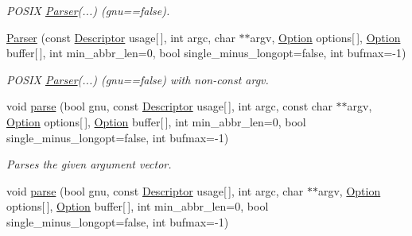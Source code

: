 \begin{DoxyCompactItemize}
\begin{DoxyCompactList}\small\item\em P\+O\+S\+IX \hyperlink{classoption_1_1Parser}{Parser}(...) (gnu==false). \end{DoxyCompactList}\item 
\hyperlink{classoption_1_1Parser_a23ee244634a38d05f6c4cb1e3692a8a9}{Parser} (const \hyperlink{structoption_1_1Descriptor}{Descriptor} usage\mbox{[}$\,$\mbox{]}, int argc, char $\ast$$\ast$argv, \hyperlink{classoption_1_1Option}{Option} options\mbox{[}$\,$\mbox{]}, \hyperlink{classoption_1_1Option}{Option} buffer\mbox{[}$\,$\mbox{]}, int min\+\_\+abbr\+\_\+len=0, bool single\+\_\+minus\+\_\+longopt=false, int bufmax=-\/1)\hypertarget{classoption_1_1Parser_a23ee244634a38d05f6c4cb1e3692a8a9}{}\label{classoption_1_1Parser_a23ee244634a38d05f6c4cb1e3692a8a9}

\begin{DoxyCompactList}\small\item\em P\+O\+S\+IX \hyperlink{classoption_1_1Parser}{Parser}(...) (gnu==false) with non-\/const argv. \end{DoxyCompactList}\item 
void \hyperlink{classoption_1_1Parser_a6e0b5778d1cfbd6cd51240e74d01e138}{parse} (bool gnu, const \hyperlink{structoption_1_1Descriptor}{Descriptor} usage\mbox{[}$\,$\mbox{]}, int argc, const char $\ast$$\ast$argv, \hyperlink{classoption_1_1Option}{Option} options\mbox{[}$\,$\mbox{]}, \hyperlink{classoption_1_1Option}{Option} buffer\mbox{[}$\,$\mbox{]}, int min\+\_\+abbr\+\_\+len=0, bool single\+\_\+minus\+\_\+longopt=false, int bufmax=-\/1)
\begin{DoxyCompactList}\small\item\em Parses the given argument vector. \end{DoxyCompactList}\item 
void \hyperlink{classoption_1_1Parser_ab26280e3b2ebc2f2fc4ed8b3b1e2a39c}{parse} (bool gnu, const \hyperlink{structoption_1_1Descriptor}{Descriptor} usage\mbox{[}$\,$\mbox{]}, int argc, char $\ast$$\ast$argv, \hyperlink{classoption_1_1Option}{Option} options\mbox{[}$\,$\mbox{]}, \hyperlink{classoption_1_1Option}{Option} buffer\mbox{[}$\,$\mbox{]}, int min\+\_\+abbr\+\_\+len=0, bool single\+\_\+minus\+\_\+longopt=false, int bufmax=-\/1)\hypertarget{classoption_1_1Parser_ab26280e3b2ebc2f2fc4ed8b3b1e2a39c}{}\label{classoption_1_1Parser_ab26280e3b2ebc2f2fc4ed8b3b1e2a39c}


\end{DoxyCompactItemize}
